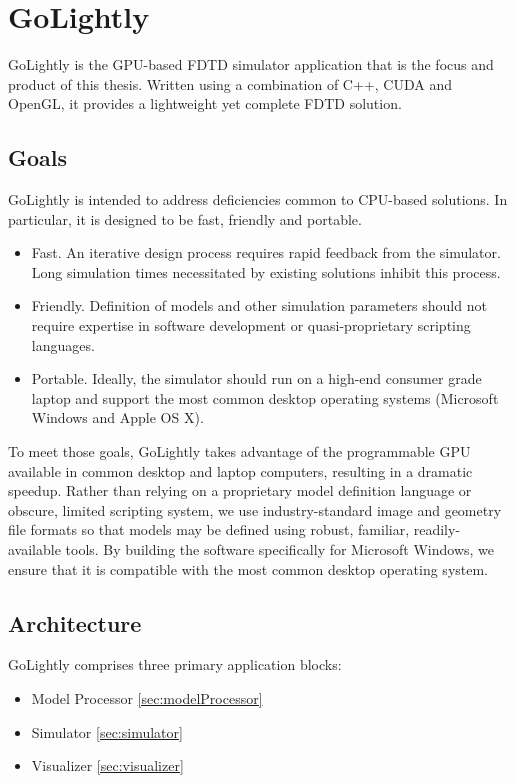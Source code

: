 \chapter{GoLightly} \label{ch:golightly}

GoLightly is the GPU-based FDTD simulator application that is the focus and product of this thesis. Written using a combination of C++, CUDA and OpenGL, it provides a lightweight yet complete FDTD solution.

\section{Goals}

GoLightly is intended to address deficiencies common to CPU-based solutions. In particular, it is designed to be fast, friendly and portable.


\begin{itemize}
	\item Fast. An iterative design process requires rapid feedback from the simulator. Long simulation times necessitated by existing solutions inhibit this process.
	\item Friendly. Definition of models and other simulation parameters should not require expertise in software development or quasi-proprietary scripting languages. 
	\item Portable. Ideally, the simulator should run on a high-end consumer grade laptop and support the most common desktop operating systems (Microsoft Windows and Apple OS X).  
\end{itemize}

To meet those goals, GoLightly takes advantage of the programmable GPU available in common desktop and laptop computers, resulting in a dramatic speedup. Rather than relying on a proprietary model definition language or obscure, limited scripting system, we use industry-standard image and geometry file formats so that models may be defined using robust, familiar, readily-available tools. By building the software specifically for Microsoft Windows, we ensure that it is compatible with the most common desktop operating system. 

\section{Architecture}

GoLightly comprises three primary application blocks:

\begin{itemize}
	\item Model Processor \ref{sec:modelProcessor}
	\item Simulator \ref{sec:simulator}
	\item Visualizer \ref{sec:visualizer}
\end{itemize}

